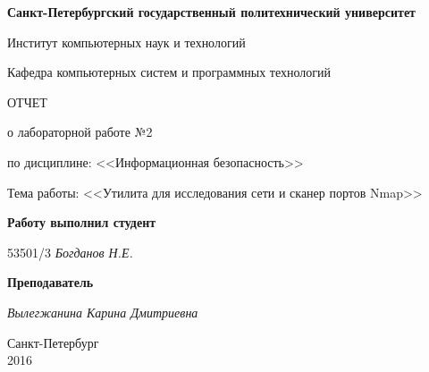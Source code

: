 \begin{titlepage}
\begin{center}

\textbf{Санкт-Петербургский государственный политехнический университет}

\vspace{5mm}
Институт компьютерных наук и технологий

\vspace{5mm}
Кафедра компьютерных систем и программных технологий

\vspace*{\fill}

\huge{ОТЧЕТ}

\Large{о лабораторной работе №2}
\vspace{2mm}

\large{по дисциплине: <<Информационная безопасность>>}

\vspace*{2mm}
\large{Тема работы: <<Утилита для исследования сети и сканер портов Nmap>>}

\vspace*{\fill}
\end{center}

\begin{large}
\hspace{0.35\linewidth} \textbf{Работу выполнил студент}

\vspace{5mm}
\hspace{0.35\linewidth} 53501/3 \hspace{1cm} \textit{Богданов Н.Е.}

\vspace{3mm}
\hspace{0.35\linewidth} \textbf{Преподаватель}

\vspace{5mm}
\hspace{0.35\linewidth} \underline{\hspace{2cm} } \hspace{3mm} \textit{Вылегжанина Карина Дмитриевна}
\end{large}

\vspace*{3cm}

\begin{center}
\normalsize Санкт-Петербург\\2016
\end{center}
\end{titlepage}